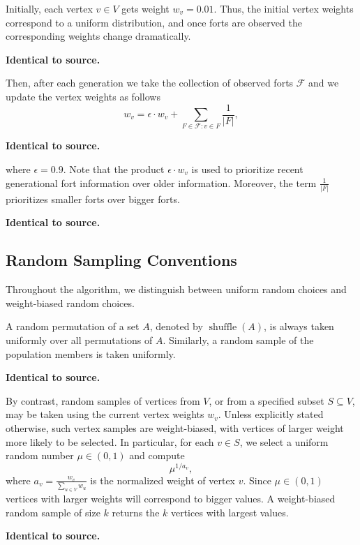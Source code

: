 \documentclass[11pt]{article}
\newcommand\abs[1]{\left|#1\right|}
\newcommand\shuffle[1]{\operatorname{shuffle}\left(#1\right)}
\newenvironment{diff}{\par\medskip\noindent\begingroup\color{red}\bfseries\boldmath}{\par\endgroup\medskip}
\begin{document}
Initially, each vertex $v\in V$ gets weight $w_{v}=0.01$.
Thus, the initial vertex weights correspond to a uniform distribution, and once forts are observed the corresponding weights change dramatically. 
\begin{diff}
Identical to source.
\end{diff}
\noindent

Then, after each generation we take the collection of observed forts $\mathcal{F}$ and we update the vertex weights as follows
\[
w_{v} = \epsilon\cdot w_{v} + \sum_{F\in\mathcal{F}\colon v\in F}\frac{1}{\abs{F}},
\]
\begin{diff}
Identical to source.
\end{diff}
\noindent

where $\epsilon=0.9$.
Note that the product $\epsilon\cdot w_{v}$ is used to prioritize recent generational fort information over older information.
Moreover, the term $\frac{1}{\abs{F}}$ prioritizes smaller forts over bigger forts. 
\begin{diff}
Identical to source.
\end{diff}


\subsection{Random Sampling Conventions}
Throughout the algorithm, we distinguish between uniform random choices and weight-biased random choices.

A random permutation of a set $A$, denoted by $\shuffle{A}$, is always taken uniformly over all permutations of $A$.
Similarly, a random sample of the population members is taken uniformly. 
\begin{diff}
Identical to source.
\end{diff}


By contrast, random samples of vertices from $V$, or from a specified subset $S\subseteq V$, may be taken using the current vertex weights $w_v$.
Unless explicitly stated otherwise, such vertex samples are weight-biased, with vertices of larger weight more likely to be selected.
In particular, for each $v\in S$, we select a uniform random number $\mu\in(0,1)$ and compute
\[
\mu^{1/a_{v}},
\]
where $a_{v}=\frac{w_{v}}{\sum_{u\in V}w_{u}}$ is the normalized weight of vertex $v$. 
Since $\mu\in(0,1)$ vertices with larger weights will correspond to bigger values.
A weight-biased random sample of size $k$ returns the $k$ vertices with largest values. 
\begin{diff}
Identical to source.
\end{diff}
\end{document}
